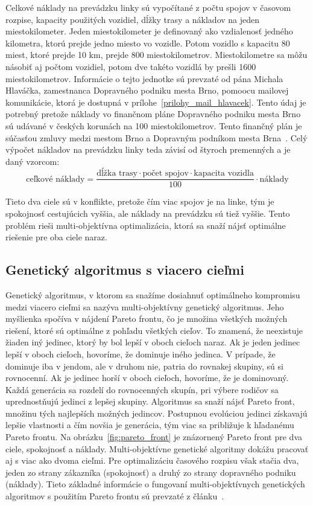 Celkové náklady na prevádzku linky sú vypočítané z počtu spojov v časovom rozpise, kapacity použitých vozidiel, dĺžky trasy a nákladov na jeden miestokilometer.
Jeden miestokilometer je definovaný ako vzdialenosť jedného kilometra, ktorú prejde jedno miesto vo vozidle.
Potom vozidlo s kapacitu 80 miest, ktoré prejde 10 km, prejde 800 miestokilometrov.
Miestokilometre sa môžu násobiť aj počtom vozidiel, potom dve takéto vozidlá by prešli 1600 miestokilometrov.
Informácie o tejto jednotke sú prevzaté od pána Michala Hlaváčka, zamestnanca Dopravného podniku mesta Brno, pomoocu mailovej komunikácie, ktorá je dostupná v prílohe~\ref{prilohy_mail_hlavacek}.
Tento údaj je potrebný pretože náklady vo finančnom pláne Dopravného podniku mesta Brno sú udávané v českých korunách na 100 miestokilometrov.
Tento finančný plán je súčasťou zmluvy medzi mestom Brno a Dopravným podníkom mesta Brna~\cite{brno_dpmb_smlouva_2023}.
Celý výpočet nákladov na prevádzku linky teda závisí od štyroch premenných a je daný vzorcom:
\begin{equation}
  \text{ceľkové náklady} = \frac{\text{dĺžka trasy} \cdot \text{počet spojov} \cdot \text{kapacita vozidla}}{100} \cdot \text{náklady}
\end{equation}

Tieto dva ciele sú v konflikte, pretože čím viac spojov je na linke, tým je spokojnosť cestujúcich vyššia, ale náklady na prevádzku sú tiež vyššie.
Tento problém rieši multi-objektívna optimalizácia, ktorá sa snaží nájsť optimálne riešenie pre oba ciele naraz.

\subsection*{Genetický algoritmus s viacero cieľmi}
Genetický algoritmus, v ktorom sa snažíme dosiahnuť optimálneho kompromisu medzi viacero cieľmi sa nazýva multi-objektívny genetický algoritmus.
Jeho myšlienka spočíva v nájdení Pareto frontu, čo je množina všetkých možných riešení, ktoré sú optimálne z pohľadu všetkých cieľov.
To znamená, že neexistuje žiaden iný jedinec, ktorý by bol lepší v oboch cieľoch naraz.
Ak je jeden jedinec lepší v oboch cieľoch, hovoríme, že dominuje iného jedinca.
V prípade, že dominuje iba v jendom, ale v druhom nie, patria do rovnakej skupiny, sú si rovnocenní.
Ak je jedinec horší v oboch cieľoch, hovoríme, že je dominovaný.
Každá generácia sa rozdelí do rovnocenných skupín, pri výbere rodičov sa uprednostňujú jedinci z lepšej skupiny.
Algoritmus sa snaží nájsť Pareto front, množinu tých najlepších možných jedincov.
Postupnou evolúciou jedinci získavajú lepšie vlastnosti a čím novšia je generácia, tým viac sa približuje k hľadanému Pareto frontu.
Na obrázku~\ref{fig:pareto_front} je znázornený Pareto front pre dva ciele, spokojnosť a náklady.
Multi-objektívne genetické algoritmy dokážu pracovať aj s viac ako dvoma cieľmi.
Pre optimalizáciu časového rozpisu však stačia dva, jeden zo strany zákazníka (spokojnosť) a druhý zo strany dopravného podniku (náklady).
Tieto základné informácie o fungovaní multi-objektívnych genetických algoritmov s použitím Pareto frontu sú prevzaté z článku~\cite{ngatchou2005pareto}.

